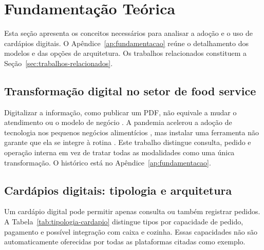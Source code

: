\chapter{Fundamentação Teórica}
\label{ch:fundamentacao}

Esta seção apresenta os conceitos necessários para analisar a adoção e o uso de cardápios digitais. O Apêndice~\ref{ap:fundamentacao} reúne o detalhamento dos modelos e das opções de arquitetura. Os trabalhos relacionados constituem a Seção~\ref{sec:trabalhos-relacionados}.

\section{Transformação digital no setor de food service}
\label{sec:td-foodservice}

Digitalizar a informação, como publicar um PDF, não equivale a mudar o atendimento ou o modelo de negócio \cite{verhoef2021digital}. A pandemia acelerou a adoção de tecnologia nos pequenos negócios alimentícios \cite{costa2021implicacoes,finkler2020impactos}, mas instalar uma ferramenta não garante que ela se integre à rotina \cite{westerman2014leading}. Este trabalho distingue consulta, pedido e operação interna em vez de tratar todas as modalidades como uma única transformação. O histórico está no Apêndice~\ref{ap:fundamentacao}.

\section{Cardápios digitais: tipologia e arquitetura}
\label{sec:cardapios-digitais}

Um cardápio digital pode permitir apenas consulta ou também registrar pedidos. A Tabela~\ref{tab:tipologia-cardapio} distingue tipos por capacidade de pedido, pagamento e possível integração com caixa e cozinha. Essas capacidades não são automaticamente oferecidas por todas as plataformas citadas como exemplo.

